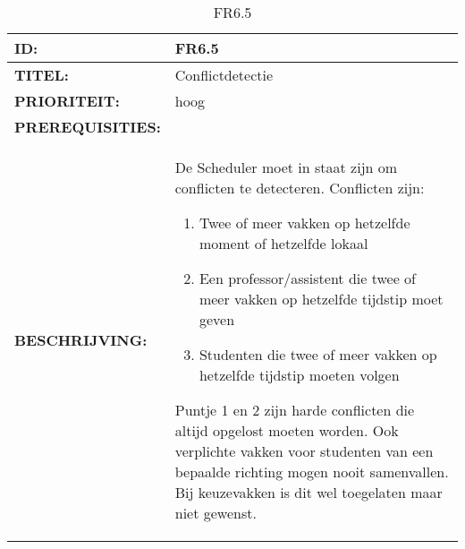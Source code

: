 \noindent\begin{table}[h]
            \begin{tabular}{l | p{10cm}}
                \textbf{ID:} & FR6.5 \\ \hline
                \textbf{TITEL:} & Conflictdetectie\\ \hline
                \textbf{PRIORITEIT:} & hoog \\ \hline
                \textbf{PREREQUISITIES:} & \\ \hline
                \textbf{BESCHRIJVING:} & De Scheduler moet in staat zijn om conflicten te detecteren. Conflicten zijn: 
                \begin{enumerate}
                \item Twee of meer vakken op hetzelfde moment of hetzelfde lokaal
                \item Een professor/assistent  die twee of meer vakken op hetzelfde tijdstip moet geven 
                \item Studenten die twee of meer vakken op hetzelfde tijdstip moeten volgen
                \end{enumerate}
                Puntje 1 en 2 zijn harde conflicten die altijd opgelost moeten worden. Ook verplichte vakken voor studenten van een bepaalde richting mogen nooit samenvallen. Bij keuzevakken is dit wel toegelaten maar niet gewenst.\\
            \end{tabular}\\
            \caption{FR6.5}
            \label{tab:mysixteenthtable}
        \end{table}
        